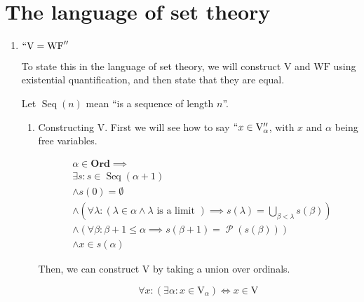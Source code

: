 \documentclass[11pt,letterpaper]{article}
\newcommand{\parens}[1]{\left(#1\right)}
\newcommand{\Union}{\bigcup}
\newcommand{\V}{\mathrm{V}}
\newcommand{\WF}{\mathrm{WF}}
\newcommand{\Ord}{\mathbf{Ord}}
\DeclareMathOperator{\SeqOp}{Seq}
\newcommand{\Seq}[1]{\SeqOp{\parens{#1}}}
\DeclareMathOperator{\PowersetOp}{\mathcal{P}}
\newcommand{\Powerset}[1]{\PowersetOp{\parens{#1}}}
\newcommand{\question}{\section}
\begin{document}
\question{The language of set theory}

\begin{enumerate}
    \item $``\V = \WF''$

        To state this in the language of set theory, we will construct $\V$ and
        $\WF$ using existential quantification, and then state that they are
        equal.

        Let $\Seq{n}$ mean ``is a sequence of length $n$''.

        \begin{enumerate}
            \item Constructing $\V$. First we will see how to say
                $``x \in \V_\alpha''$, with $x$ and $\alpha$ being free
                variables.

                \begin{align*}
                    & \alpha \in \Ord \implies \\
                    & \exists s :
                        s \in \Seq{\alpha + 1} \\
                    & \land s(0) = \emptyset \\
                    & \land
                    \parens{
                        \forall \lambda :
                        (
                            \lambda \in \alpha
                            \land
                            \lambda \text{ is a limit }
                        )
                        \implies
                        s(\lambda) = \Union_{\beta < \lambda} s(\beta)
                    } \\
                    & \land
                    \parens{
                        \forall \beta :
                        \beta + 1 \leq \alpha
                        \implies
                        s(\beta + 1) = \Powerset{s(\beta)}
                    } \\
                    & \land
                    x \in s(\alpha)
                \end{align*}

                Then, we can construct $\V$ by taking a union over ordinals.

                \begin{equation*}
                    \forall x :
                    (\exists \alpha : x \in \V_\alpha)
                    \iff
                    x \in \V
                \end{equation*}


\end{enumerate}
\end{enumerate}
\end{document}

